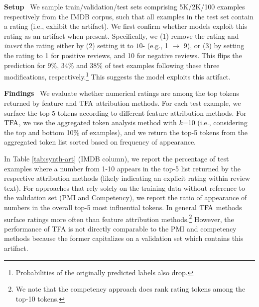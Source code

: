 \documentclass[11pt]{article}
\newcommand\para[1]{\vskip 1mm\noindent\textbf{#1}~}
\begin{document}
\para{Setup} We sample train/validation/test sets comprising 5K/2K/100 examples respectively from the IMDB corpus, such that all examples in the test set contain a rating (i.e., exhibit the artifact). 
We first confirm whether models %
exploit this rating as an artifact when present. 
Specifically, we (1) remove the rating and \emph{invert} the rating either by (2) setting it to $10$- (e.g., 1 $\rightarrow$ 9), or (3) by setting the rating to 1 for positive reviews, and 10 for negative reviews. 
This flips the prediction for 9\%, 34\% and 38\% of test examples following these three modifications, respectively.\footnote{Probabilities of the originally predicted labels also drop.} %
This suggests the model exploits this artifact.

\para{Findings} We evaluate whether numerical ratings are %
among the top tokens returned by feature and $\text{TFA}$ attribution methods. 
For each test example, we surface the top-5 tokens according to different feature attribution methods. 
For $\text{TFA}$, we use the aggregated token analysis method with $k$=10 (i.e., considering the top and bottom 10\% of examples), and we return the top-5 tokens from the aggregated token list sorted based on frequency of appearance.

In Table \ref{tab:synth-art} (IMDB column), we report the percentage of test examples where a number from 1-10 appears in the top-5 list returned by the respective attribution methods (likely indicating an explicit rating within review text). 
For approaches that rely solely on the training data without reference to the validation set (PMI and Competency), we report the ratio of appearance of numbers in the overall top-5 most influential tokens. 
In general $\text{TFA}$ methods surface ratings more often than feature attribution methods.\footnote{We note that the competency approach does rank rating tokens among the top-10 tokens.} 
However, the performance of TFA is not directly comparable to the PMI and competency methods because the former capitalizes on a validation set which contains this artifact. 
\end{document}
